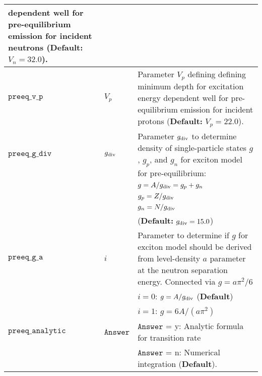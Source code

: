 \documentclass[
10pt,
showpacs,preprintnumbers,footinbib,
amsfonts,amsmath,amssymb,
aps,
prc,twocolumn,groupedaddress,superscriptaddress,
showkeys,
nofootinbib
]{revtex4-1}
\begin{document}
\begin{center}
\begin{tabular}{| p{4cm} | p{4cm} | p{9cm} |}
    dependent well for pre-equilibrium emission for incident neutrons
    ({\bf Default:} $V_n = 32.0$).\\
\hline
${\texttt{preeq\_v\_p}}$  & $V_p$  &   Parameter $V_p$ defining defining minimum depth for excitation energy
    dependent well for pre-equilibrium emission for incident protons
    ({\bf Default:} $V_p = 22.0$).\\
\hline
${\texttt{preeq\_g\_div}}$ & $ g_{\rm div}$ & Parameter $g_{\rm div}$ to determine density of single-particle states $g$, $g_p$, and $g_n$ for 
    exciton model for pre-equilibrium: \\
 & &    $g = A/g_{\rm div} = g_p + g_n$ \\
 & &     $g_p = Z/g_{\rm div}$\\
 & &     $g_n = N/g_{\rm div}$\\
 & & ({\bf Default:} $g_{\rm div} =15.0$)\\
\hline
${\texttt{preeq\_g\_a}}$  & $i$ &  Parameter to determine if $g$ for exciton model should be derived from 
    level-density $a$ parameter at the neutron separation energy. Connected via 
    $ g = a \pi^2/6$\\
&  &  $i  = 0$:  $g = A/g_{\rm div}$  ({\bf Default})\\
 &  &  $i = 1$: $g = 6A/(a\pi^2)$\\
\hline
${\texttt{preeq\_analytic}}$  &  ${\texttt{Answer}}$  &  ${\texttt{Answer}}$ = y:   Analytic formula for transition rate \\
 &  &     ${\texttt{Answer}}$ = n:  Numerical integration ({\bf Default}).\\
\hline
\end{tabular}
\end{center}
%
\end{document}
